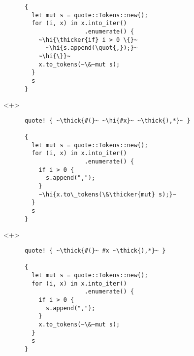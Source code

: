 \documentclass[usepdftitle=false]{beamer}
\renewcommand{\&}{\makebox[\widthof{\ampersand}][c]{\scalebox{0.9}[1.0]{\Book\ampersand}}}
\newcommand{\+}{\makebox[\widthof{+}][c]{\raisebox{-.2\height}{\scalefont{1.5}\Light+}}}
\newcommand{\thick}[1]{\contourlength{0.12pt}\contour[10]{black}{#1}}
\newcommand{\thicker}[1]{\contourlength{0.26pt}\contour[10]{black}{#1}}
\newcommand{\hi}[1]{%
\tikz[baseline=(A.base)]
 \node[highlighting=0,inner sep=0pt,text depth=0pt] (A) {#1};%
}
\newcommand{\quot}[1]{''#1''}
\begin{document}
\begin{frame}[fragile]
\begin{onlyenv}
\begin{verbatim}
      {
        let mut s = quote::Tokens::new();
        for (i, x) in x.into_iter()
                       .enumerate() {
          ~\hi{\thicker{if} i > 0 \{}~
            ~\hi{s.append(\quot{,});}~
          ~\hi{\}}~
          x.to_tokens(~\&~mut s);
        }
        s
      }
    \end{verbatim}
  \end{onlyenv}
  \begin{onlyenv}<+>
    \begin{verbatim}
      quote! { ~\thick{#(}~ ~\hi{#x}~ ~\thick{),*}~ }

      {
        let mut s = quote::Tokens::new();
        for (i, x) in x.into_iter()
                       .enumerate() {
          if i > 0 {
            s.append(",");
          }
          ~\hi{x.to\_tokens(\&\thicker{mut} s);}~
        }
        s
      }
    \end{verbatim}
  \end{onlyenv}
  \begin{onlyenv}<+>
    \begin{verbatim}
      quote! { ~\thick{#(}~ #x ~\thick{),*}~ }

      {
        let mut s = quote::Tokens::new();
        for (i, x) in x.into_iter()
                       .enumerate() {
          if i > 0 {
            s.append(",");
          }
          x.to_tokens(~\&~mut s);
        }
        s
      }
    \end{verbatim}
  \end{onlyenv}
\end{frame}
\end{document}

